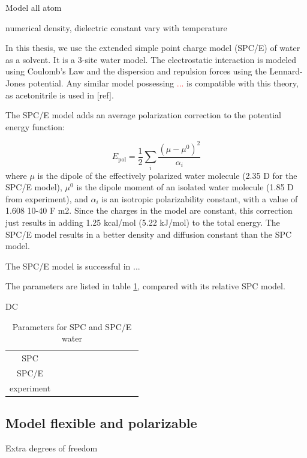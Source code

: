 Model all atom

numerical density, dielectric constant vary with temperature

In this thesis, we use the extended simple point charge model (SPC/E)
of water \citep{SPC/E} as a solvent. It is a 3-site water model. The
electrostatic interaction is modeled using Coulomb's Law and the dispersion
and repulsion forces using the Lennard-Jones potential. Any similar
model possessing \textcolor{red}{...} is compatible with this theory,
as acetonitrile is used in {[}ref{]}.

The SPC/E model adds an average polarization correction to the potential
energy function:

\[
E_{\mathrm{pol}}=\frac{1}{2}\sum_{i}\dfrac{(\mu-\mu^{0})^{2}}{\alpha_{i}}
\]
where $\mu$ is the dipole of the effectively polarized water molecule
(2.35 D for the SPC/E model), $\mu^{0}$ is the dipole moment of an
isolated water molecule (1.85 D from experiment), and $\alpha_{i}$
is an isotropic polarizability constant, with a value of 1.608 \texttimes{}
10-40 F m2. Since the charges in the model are constant, this correction
just results in adding 1.25 kcal/mol (5.22 kJ/mol) to the total energy.
The SPC/E model results in a better density and diffusion constant
than the SPC model.

The SPC/E model is successful in ... 

The parameters are listed in table \ref{tab:SPC/E}, compared with
its relative SPC model.

DC \citep{Kusalik_1994_dc_spc/e}

\begin{table}
\begin{tabular}{|c|c|c|c|c|c|c|c|c|c|c|}
\hline 
 &  &  &  &  &  &  &  &  &  & \tabularnewline
\hline 
\hline 
SPC &  &  &  &  &  &  &  &  &  & \tabularnewline
\hline 
SPC/E &  &  &  &  &  &  &  &  &  & \tabularnewline
\hline 
experiment &  &  &  &  &  &  &  &  &  & \tabularnewline
\hline 
\end{tabular}

\caption{Parameters for SPC and SPC/E water\label{tab:SPC/E}}
\end{table}



\subsection{Model flexible and polarizable}

Extra degrees of freedom

